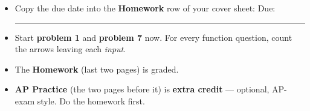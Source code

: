 \documentclass[aspectratio=169, 11pt]{beamer}
\begin{document}
\begin{frame}[t, plain]

  \begin{itemize}\setlength{\itemsep}{8pt}
    \item Copy the due date into the \textbf{Homework} row of your cover sheet:
          \quad Due: \rule{3cm}{0.4pt}
    \item Start \textbf{problem 1} and \textbf{problem 7} now. For every function
          question, count the arrows leaving each \textit{input}.
    \item The \textbf{Homework} (last two pages) is graded.
    \item \textbf{AP Practice} (the two pages before it) is \textbf{extra credit}
          --- optional, AP-exam style. Do the homework first.
  \end{itemize}
\end{frame}
\end{document}

